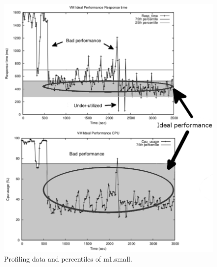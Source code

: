 \begin{enumerate}


\begin{figure}
  \begin{center}
    \includegraphics[width=\linewidth]{images/idealSmallRemark.pdf}
  \end{center}
\vspace{-5mm}
  \caption{Profiling data and percentiles of m1.small.}
  \label{fig:vm_performance1}
\end{figure}


\end{enumerate}
